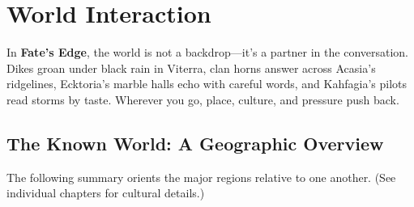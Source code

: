 \chapter{World Interaction}
\label{ch:world-interaction}

In \textbf{Fate's Edge}, the world is not a backdrop—it's a partner in the conversation. Dikes groan under black rain in Viterra, clan horns answer across Acasia's ridgelines, Ecktoria's marble halls echo with careful words, and Kahfagia's pilots read storms by taste. Wherever you go, place, culture, and pressure push back.

\section{The Known World: A Geographic Overview}
\label{sec:known-world}

The following summary orients the major regions relative to one another. (See individual chapters for cultural details.)

